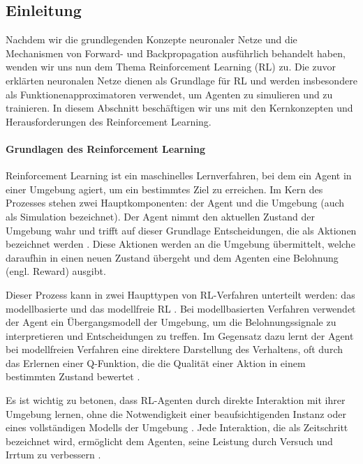 \subsection{Einleitung}

Nachdem wir die grundlegenden Konzepte neuronaler Netze und die Mechanismen von Forward- und Backpropagation ausführlich behandelt haben, wenden wir uns nun dem Thema Reinforcement Learning (RL) zu. Die zuvor erklärten neuronalen Netze dienen als Grundlage für RL und werden insbesondere als Funktionenapproximatoren verwendet, um Agenten zu simulieren und zu trainieren. In diesem Abschnitt beschäftigen wir uns mit den Kernkonzepten und Herausforderungen des Reinforcement Learning.

\paragraph{Grundlagen des Reinforcement Learning}

Reinforcement Learning ist ein maschinelles Lernverfahren, bei dem ein Agent in einer Umgebung agiert, um ein bestimmtes Ziel zu erreichen. Im Kern des Prozesses stehen zwei Hauptkomponenten: der Agent und die Umgebung (auch als Simulation bezeichnet). Der Agent nimmt den aktuellen Zustand der Umgebung wahr und trifft auf dieser Grundlage Entscheidungen, die als Aktionen bezeichnet werden \cite{morales2020grokking}. Diese Aktionen werden an die Umgebung übermittelt, welche daraufhin in einen neuen Zustand übergeht und dem Agenten eine Belohnung (engl. Reward) ausgibt.

Dieser Prozess kann in zwei Haupttypen von RL-Verfahren unterteilt werden: das modellbasierte und das modellfreie RL \cite{russell2021ai}. Bei modellbasierten Verfahren verwendet der Agent ein Übergangsmodell der Umgebung, um die Belohnungssignale zu interpretieren und Entscheidungen zu treffen. Im Gegensatz dazu lernt der Agent bei modellfreien Verfahren eine direktere Darstellung des Verhaltens, oft durch das Erlernen einer Q-Funktion, die die Qualität einer Aktion in einem bestimmten Zustand bewertet \cite{russell2021ai}.

Es ist wichtig zu betonen, dass RL-Agenten durch direkte Interaktion mit ihrer Umgebung lernen, ohne die Notwendigkeit einer beaufsichtigenden Instanz oder eines vollständigen Modells der Umgebung \cite{SuttonBarto2018}. Jede Interaktion, die als Zeitschritt bezeichnet wird, ermöglicht dem Agenten, seine Leistung durch Versuch und Irrtum zu verbessern \cite{morales2020grokking}.

